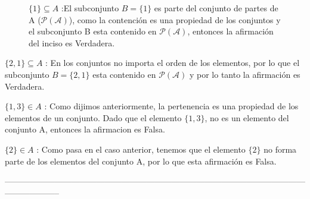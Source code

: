 \documentclass[10pt]{article}
\begin{document}
\begin{ej}
\begin{itemize}
\begin{figure}[H]
\begin{minipage}[b]{0.4\linewidth}
		\centering
  \item[ii)]$\{1\} \subseteq A$ :\sffamily El subconjunto $B=\{1\}$ es parte del conjunto de partes de A ($\mathcal{P(A)}$), como la contención es una propiedad de los conjuntos y el subconjunto B esta contenido en $\mathcal{P(A)}$, entonces la afirmación del inciso es \textcolor{G}{Verdadera}.
\end{minipage}
\begin{minipage}[b]{0.5\linewidth}
		\centering
{}
\end{minipage}
\end{figure}
 \item[iii)]$\{2,1\} \subseteq A$ : \sffamily En los conjuntos no importa el orden de los elementos, por lo que el subconjunto $B = \{2,1\}$ esta contenido en $\mathcal{P(A)}$ y por lo tanto la afirmación es \textcolor{G}{Verdadera}. 
 \item[iv)] $\{1,3\} \in A$ : \sffamily Como dijimos anteriormente, la pertenencia es una propiedad de los elementos de un conjunto. Dado que el elemento $\{1,3\}$, no es un elemento del conjunto A, entonces la afirmacion es \textcolor{R}{Falsa}.
 \item[v)]$\{ 2 \} \in A$ : \sffamily Como pasa en el caso anterior, tenemos que el elemento $\{2\}$ no forma parte de los elementos del conjunto A, por lo que esta afirmación es \textcolor{R}{Falsa}.
\end{itemize}
\end{ej}
--------------------------------------------------------------------------------------------------------------------------------
\end{document}
